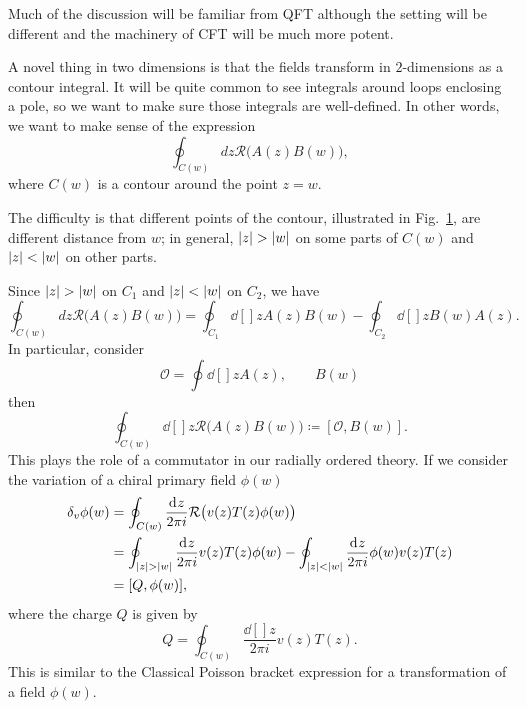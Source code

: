 
Much of the discussion will be familiar from QFT although the setting will be different and the machinery of CFT will be much more potent.

A novel thing in two dimensions is that the fields transform in $2$-dimensions as a contour integral.
It will be quite common to see integrals around loops enclosing a pole, so we want to make sure those integrals are well-defined.
In other words, we want to make sense of the expression
\begin{equation}
  \oint_{C(w)} dz \mathcal{R} \bigl( A(z) B(w) \bigr),
\end{equation}
where $C(w)$ is a contour around the point $z = w$.

The difficulty is that different points of the contour, illustrated in Fig.~\ref{fig:l13f1}, are different distance from $w$; in general, $\abs{z} > \abs{w}$ on some parts of $C(w)$ and $\abs{z} < \abs{w}$ on other parts.
\begin{figure}[tbhp]
  \centering
  \def\svgwidth{0.9\columnwidth}
  
  \caption{}
  \label{fig:l13f1}
\end{figure}
Since $\abs{z} > \abs{w}$ on $C_1$ and $\abs{z} < \abs{w}$ on $C_2$, we have
\begin{equation}
  \oint_{C(w)} dz \mathcal{R} \bigl( A(z) B(w) \bigr) = \oint_{C_1} \dd[]{z} A(z) B(w) - \oint_{C_2} \dd[]{z} B(w) A(z).
\end{equation}
In particular, consider
\begin{equation}
  \mathcal{O} = \oint \dd[]{z} A(z), \qquad B(w)
\end{equation}
then
\begin{equation}
  \oint_{C(w)} \dd[]{z} \mathcal{R} \bigl( A(z) B(w) \bigr) \coloneqq [\mathcal{O}, B(w)].
\end{equation}
This plays the role of a commutator in our radially ordered theory.
If we consider the variation of a chiral primary field $\phi(w)$
\begin{align}
  \delta_v \phi(w) &= \oint_{C(w)} \frac{\dd[]{z}}{2 \pi i} \mathcal{R} \bigl( v(z) T(z) \phi(w) \bigr) \\
		   &= \oint_{\abs{z} > \abs{w}} \frac{\dd[]{z}}{2 \pi i} v(z) T(z) \phi(w) - \oint_{\abs{z} < \abs{w}} \frac{\dd[]{z}}{2 \pi i } \phi(w) v(z) T(z) \label{eq:13-1} \\
		   &= [Q, \phi(w)],
\end{align}
where the charge $Q$ is given by
\begin{equation}
  Q = \oint_{C(w)} \frac{\dd[]{z}}{2 \pi i} v(z) T(z).
\end{equation}
This is similar to the Classical Poisson bracket expression for a transformation of a field $\phi(w)$.


